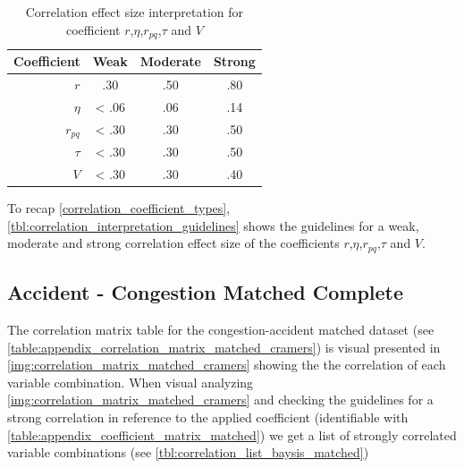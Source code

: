 \begin{table}[ht]
	\centering
	\begin{tabular}{r|c|c|c}  
		\toprule
		Coefficient & Weak 	& Moderate 	& Strong \\
		\midrule
		$r$ 		& .30	& .50		& .80 \\
		$\eta$ 		& < .06 & .06		& .14 \\
		$r_{pq}$	& < .30	& .30		& .50 \\
		$\tau$ 		& < .30	& .30		& .50 \\
		$V$ 		& < .30	& .30		& .40 \\
		\bottomrule
	\end{tabular}
	\caption{Correlation effect size interpretation for coefficient $r$,$\eta$,$r_{pq}$,$\tau$ and $V$}
	\label{tbl:correlation_interpretation_guidelines}
\end{table}

To recap \autoref{correlation_coefficient_types}, \autoref{tbl:correlation_interpretation_guidelines} shows the guidelines for a weak, moderate and strong correlation effect size of the coefficients $r$,$\eta$,$r_{pq}$,$\tau$ and $V$.

\subsection{Accident - Congestion Matched Complete}
\label{analysis_processing_correlation}
The correlation matrix table for the congestion-accident matched dataset (see \autoref{table:appendix_correlation_matrix_matched_cramers}) is visual presented in \autoref{img:correlation_matrix_matched_cramers} showing the the correlation of each variable combination. When visual analyzing \autoref{img:correlation_matrix_matched_cramers} and checking the guidelines for a strong correlation in reference to the applied coefficient (identifiable with \autoref{table:appendix_coefficient_matrix_matched}) we get a list of strongly correlated variable combinations (see \autoref{tbl:correlation_list_baysis_matched})

